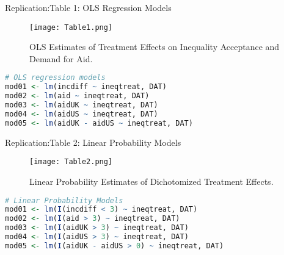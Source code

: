 \documentclass[aspectratio=169,10pt,compress]{beamer}
\begin{document}
\begin{frame}[fragile]{Replication:Table 1: OLS Regression Models}
  \begin{figure}
    \centering
    \texttt{[image: Table1.png]}
    \caption{OLS Estimates of Treatment Effects on Inequality Acceptance and Demand for Aid.}
  \end{figure}
  
  \begin{lstlisting}[language=R]
# OLS regression models
mod01 <- lm(incdiff ~ ineqtreat, DAT)
mod02 <- lm(aid ~ ineqtreat, DAT)
mod03 <- lm(aidUK ~ ineqtreat, DAT)
mod04 <- lm(aidUS ~ ineqtreat, DAT)
mod05 <- lm(aidUK - aidUS ~ ineqtreat, DAT)
  \end{lstlisting}
  
\end{frame}
\begin{frame}[fragile]{Replication:Table 2: Linear Probability Models}
  \begin{figure}
    \centering
    \texttt{[image: Table2.png]}
    \caption{Linear Probability Estimates of Dichotomized Treatment Effects.}
  \end{figure}
  
  \begin{lstlisting}[language=R]
# Linear Probability Models
mod01 <- lm(I(incdiff < 3) ~ ineqtreat, DAT)
mod02 <- lm(I(aid > 3) ~ ineqtreat, DAT)
mod03 <- lm(I(aidUK > 3) ~ ineqtreat, DAT)
mod04 <- lm(I(aidUS > 3) ~ ineqtreat, DAT)
mod05 <- lm(I(aidUK - aidUS > 0) ~ ineqtreat, DAT)
  \end{lstlisting}
  
\end{frame}
\end{document}
